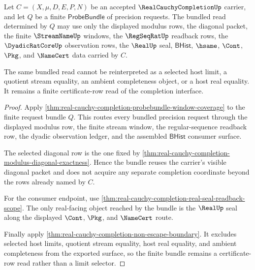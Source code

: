 \begin{theorem}
\label{thm:real-cauchy-completion-selector-refusal-boundary}
Let $C=(X,\mu,D,E,P,N)$ be an accepted $\RealCauchyCompletionUp$ carrier, and let $Q$ be a finite $\mathsf{ProbeBundle}$ of precision requests. The bundled read determined by $Q$ may use only the displayed modulus rows, the diagonal packet, the finite $\StreamNameUp$ windows, the $\RegSeqRatUp$ readback rows, the $\DyadicRatCoreUp$ observation rows, the $\RealUp$ seal, $\mathsf{BHist}$, $\hsame$, $\Cont$, $\Pkg$, and $\NameCert$ data carried by $C$.

The same bundled read cannot be reinterpreted as a selected host limit, a quotient stream equality, an ambient completeness object, or a host real equality. It remains a finite certificate-row read of the completion interface.
\end{theorem}
\begin{proof}
Apply \autoref{thm:real-cauchy-completion-probebundle-window-coverage} to the finite request bundle $Q$. This routes every bundled precision request through the displayed modulus row, the finite stream window, the regular-sequence readback row, the dyadic observation ledger, and the assembled $\mathsf{BHist}$ consumer surface.

The selected diagonal row is the one fixed by \autoref{thm:real-cauchy-completion-modulus-diagonal-exactness}. Hence the bundle reuses the carrier's visible diagonal packet and does not acquire any separate completion coordinate beyond the rows already named by $C$.

For the consumer endpoint, use \autoref{thm:real-cauchy-completion-real-seal-readback-scope}. The only real-facing object reached by the bundle is the $\RealUp$ seal along the displayed $\Cont$, $\Pkg$, and $\NameCert$ route.

Finally apply \autoref{thm:real-cauchy-completion-non-escape-boundary}. It excludes selected host limits, quotient stream equality, host real equality, and ambient completeness from the exported surface, so the finite bundle remains a certificate-row read rather than a limit selector.
\end{proof}

